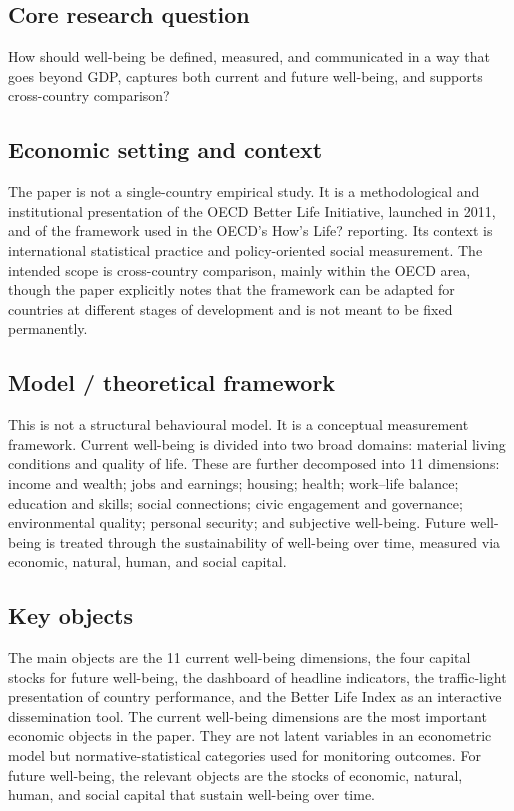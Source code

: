\documentclass[11pt,a4paper]{article}
\begin{document}
\subsection*{Core research question}
How should well-being be defined, measured, and communicated in a way that goes beyond GDP, captures both current and future well-being, and supports cross-country comparison?

\subsection*{Economic setting and context}
The paper is not a single-country empirical study. It is a methodological and institutional presentation of the OECD Better Life Initiative, launched in 2011, and of the framework used in the OECD’s How’s Life? reporting. Its context is international statistical practice and policy-oriented social measurement. The intended scope is cross-country comparison, mainly within the OECD area, though the paper explicitly notes that the framework can be adapted for countries at different stages of development and is not meant to be fixed permanently.

\subsection*{Model / theoretical framework}
This is not a structural behavioural model. It is a conceptual measurement framework. Current well-being is divided into two broad domains: material living conditions and quality of life. These are further decomposed into 11 dimensions: income and wealth; jobs and earnings; housing; health; work–life balance; education and skills; social connections; civic engagement and governance; environmental quality; personal security; and subjective well-being. Future well-being is treated through the sustainability of well-being over time, measured via economic, natural, human, and social capital.

\subsection*{Key objects}
The main objects are the 11 current well-being dimensions, the four capital stocks for future well-being, the dashboard of headline indicators, the traffic-light presentation of country performance, and the Better Life Index as an interactive dissemination tool. The current well-being dimensions are the most important economic objects in the paper. They are not latent variables in an econometric model but normative-statistical categories used for monitoring outcomes. For future well-being, the relevant objects are the stocks of economic, natural, human, and social capital that sustain well-being over time.
\end{document}
